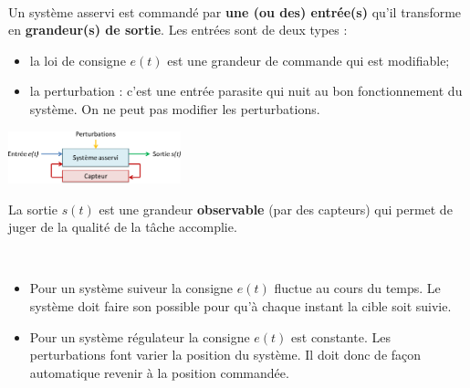 \documentclass[10pt,fleqn]{article} %
\begin{document}
\begin{defi} ~\\

\noindent\begin{minipage}[c]{11cm}
Un système asservi est commandé par \textbf{une (ou des) entrée(s)} qu'il
transforme en \textbf{grandeur(s) de sortie}.
Les entrées sont de deux types : 
\begin{itemize}
 \item la loi de consigne $e(t)$ est une grandeur de commande qui est
modifiable;
\item la perturbation : c'est une entrée parasite qui nuit au bon
fonctionnement du système. On ne peut pas modifier les perturbations.
\end{itemize}
\end{minipage} \hfill
\begin{minipage}[c]{5cm}
\includegraphics[width=5cm]{images/Systeme_Asservi}
\end{minipage}

\noindent
La sortie $s(t)$ est une grandeur \textbf{observable} (par des capteurs) qui
permet de juger de la qualité de la tâche accomplie.


\end{defi} 


\begin{defi} ~\\
\begin{itemize}[label=,font=\color{ocre}] 
\item Pour un système suiveur la consigne $e(t)$ fluctue au cours du temps. Le système doit faire son possible pour qu'à chaque instant la cible soit suivie.
\item Pour un système régulateur la consigne $e(t)$ est constante. Les perturbations font varier la position du système. Il doit donc de façon automatique revenir à la position commandée.
\end{itemize}
\end{defi}


\begin{center}

\hspace{2cm}

\end{center}
\end{document}
